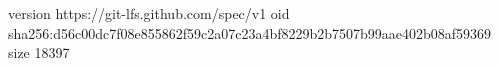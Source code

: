 version https://git-lfs.github.com/spec/v1
oid sha256:d56c00dc7f08e855862f59c2a07c23a4bf8229b2b7507b99aae402b08af59369
size 18397
